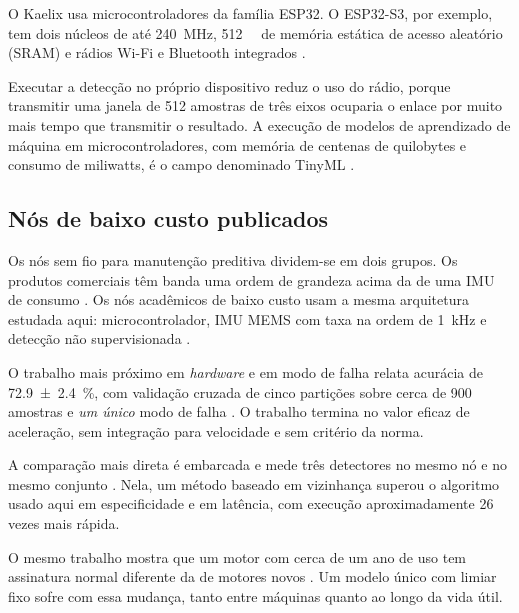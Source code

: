 O Kaelix usa microcontroladores da família ESP32. O ESP32-S3, por exemplo, tem dois núcleos de até \SI{240}{\mega\hertz}, \SI{512}{\kilo\byte} de memória estática de acesso aleatório (SRAM) e
rádios Wi-Fi e Bluetooth integrados \cite{espressif2026}.

Executar a detecção no próprio dispositivo reduz o uso do rádio, porque transmitir uma janela de \num{512} amostras de três eixos ocuparia o enlace por muito mais tempo que transmitir o resultado. A
execução de modelos de aprendizado de máquina em microcontroladores, com memória de centenas de quilobytes e consumo de miliwatts, é o campo denominado TinyML \cite{antonini2023,barbariol2022}.

\subsection{Nós de baixo custo publicados}
\label{sec:rev-implantacao}

Os nós sem fio para manutenção preditiva dividem-se em dois grupos. Os produtos comerciais têm banda uma ordem de grandeza acima da de uma IMU de consumo
\cite{bentlynevada2025,erbessd2025,tractian2022}. Os nós acadêmicos de baixo custo usam a mesma arquitetura estudada aqui: microcontrolador, IMU MEMS com taxa na ordem de \SI{1}{\kilo\hertz} e
detecção não supervisionada \cite{antonini2023,bisio2025,kolok2025}.

O trabalho mais próximo em \emph{hardware} e em modo de falha relata acurácia de \SI{72,9 \pm 2,4}{\percent}, com validação cruzada de cinco partições sobre cerca de \num{900} amostras e \emph{um
único} modo de falha \cite{kolok2025}. O trabalho termina no valor eficaz de aceleração, sem integração para velocidade e sem critério da norma.

A comparação mais direta é embarcada e mede três detectores no mesmo nó e no mesmo conjunto \cite{chevtchenko2023}. Nela, um método baseado em vizinhança superou o algoritmo usado aqui em
especificidade e em latência, com execução aproximadamente \num{26} vezes mais rápida. 

O mesmo trabalho mostra que um motor com cerca de um ano de uso tem assinatura normal diferente da de motores novos \cite{chevtchenko2023}. Um modelo único com limiar fixo sofre com essa mudança,
tanto entre máquinas quanto ao longo da vida útil.

